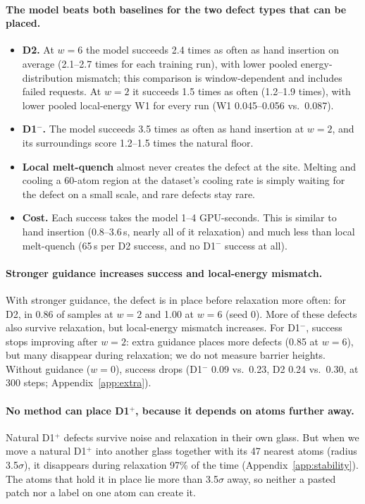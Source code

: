 \documentclass[10pt]{article}
\newcommand{\Dm}{D1$^{-}$}
\newcommand{\Dp}{D1$^{+}$}
\begin{document}
\paragraph{The model beats both baselines for the two defect types that can be placed.}
\begin{itemize}
\item \textbf{D2.} At $w=6$ the model succeeds 2.4 times as often as hand insertion on average (2.1--2.7 times for each training run), with lower pooled energy-distribution mismatch; this comparison is window-dependent and includes failed requests. At $w=2$ it succeeds 1.5 times as often (1.2--1.9 times), with lower pooled local-energy W1 for every run (W1 0.045--0.056 vs.\ 0.087).
\item \textbf{\Dm.} The model succeeds 3.5 times as often as hand insertion at $w=2$, and its surroundings score 1.2--1.5 times the natural floor.
\item \textbf{Local melt-quench} almost never creates the defect at the site. Melting and cooling a 60-atom region at the dataset's cooling rate is simply waiting for the defect on a small scale, and rare defects stay rare.
\item \textbf{Cost.} Each success takes the model 1--4 GPU-seconds. This is similar to hand insertion (0.8--3.6\,s, nearly all of it relaxation) and much less than local melt-quench (65\,s per D2 success, and no \Dm{} success at all).
\end{itemize}

\paragraph{Stronger guidance increases success and local-energy mismatch.} With stronger guidance, the defect is in place before relaxation more often: for D2, in 0.86 of samples at $w=2$ and 1.00 at $w=6$ (seed 0). More of these defects also survive relaxation, but local-energy mismatch increases. For \Dm{}, success stops improving after $w=2$: extra guidance places more defects (0.85 at $w=6$), but many disappear during relaxation; we do not measure barrier heights. Without guidance ($w=0$), success drops (\Dm{} 0.09 vs.\ 0.23, D2 0.24 vs.\ 0.30, at 300 steps; Appendix~\ref{app:extra}).

\paragraph{No method can place \Dp{}, because it depends on atoms further away.} Natural \Dp{} defects survive noise and relaxation in their own glass. But when we move a natural \Dp{} into another glass together with its 47 nearest atoms (radius 3.5$\sigma$), it disappears during relaxation 97\% of the time (Appendix~\ref{app:stability}). The atoms that hold it in place lie more than 3.5$\sigma$ away, so neither a pasted patch nor a label on one atom can create it.
\end{document}
